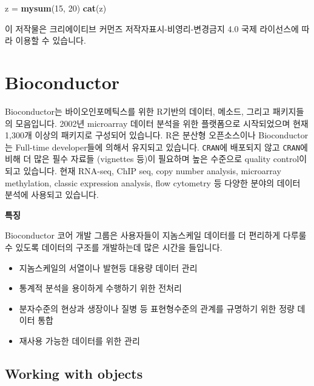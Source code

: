 \documentclass[
]{book}
\newenvironment{Shaded}{\begin{snugshade}}{\end{snugshade}}
\newcommand{\DecValTok}[1]{\textcolor[rgb]{0.00,0.00,0.81}{#1}}
\newcommand{\KeywordTok}[1]{\textcolor[rgb]{0.13,0.29,0.53}{\textbf{#1}}}
\newcommand{\NormalTok}[1]{#1}
\newcommand{\StringTok}[1]{\textcolor[rgb]{0.31,0.60,0.02}{#1}}
\providecommand{\tightlist}{%
  \setlength{\itemsep}{0pt}\setlength{\parskip}{0pt}}
\begin{document}
\begin{Shaded}
\begin{Highlighting}[]
\NormalTok{z =}\StringTok{ }\KeywordTok{mysum}\NormalTok{(}\DecValTok{15}\NormalTok{, }\DecValTok{20}\NormalTok{)}
\KeywordTok{cat}\NormalTok{(z)}
\end{Highlighting}
\end{Shaded}

이 저작물은 크리에이티브 커먼즈 저작자표시-비영리-변경금지 4.0 국제 라이선스에 따라 이용할 수 있습니다.

\hypertarget{bioconductor}{%
\chapter{Bioconductor}\label{bioconductor}}

Bioconductor는 바이오인포메틱스를 위한 R기반의 데이터, 메소드, 그리고 패키지들의 모음입니다. 2002년 microarray 데이터 분석을 위한 플랫폼으로 시작되었으며 현재 1,300개 이상의 패키지로 구성되어 있습니다. R은 분산형 오픈소스이나 Bioconductor는 Full-time developer들에 의해서 유지되고 있습니다. \texttt{CRAN}에 배포되지 않고 \texttt{CRAN}에 비해 더 많은 필수 자료들 (vignettes 등)이 필요하며 높은 수준으로 quality control이 되고 있습니다. 현재 RNA-seq, ChIP seq, copy number analysis, microarray methylation, classic expression analysis, flow cytometry 등 다양한 분야의 데이터 분석에 사용되고 있습니다.

\textbf{특징}

Bioconductor 코어 개발 그룹은 사용자들이 지놈스케일 데이터를 더 편리하게 다루룰 수 있도록 데이터의 구조를 개발하는데 많은 시간을 들입니다.

\begin{itemize}
\tightlist
\item
  지놈스케일의 서열이나 발현등 대용량 데이터 관리\\
\item
  통계적 분석을 용이하게 수행하기 위한 전처리\\
\item
  분자수준의 현상과 생장이나 질병 등 표현형수준의 관계를 규명하기 위한 정량 데이터 통합\\
\item
  재사용 가능한 데이터를 위한 관리
\end{itemize}

\hypertarget{working-with-objects}{%
\section{Working with objects}\label{working-with-objects}}
\end{document}
